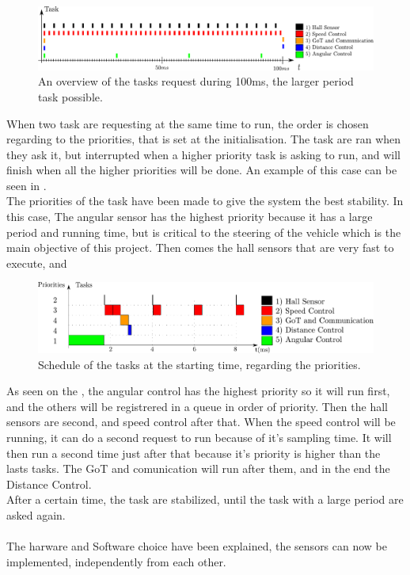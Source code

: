 \begin{figure}[H]
	\centering
	\includegraphics[scale=0.6]{figures/scheduleRequest.pdf}
	\caption{An overview of the tasks request during 100ms, the larger period task possible.}
	\label{scheduleRequestdRobinSchedule}
\end{figure}


When two task are requesting at the same time to run, the order is chosen regarding to the priorities, that is set at the initialisation. The task are ran when they ask it, but interrupted when a higher priority task is asking to run, and will finish when all the higher priorities will be done. An example of this case can be seen in .\\
The priorities of the task have been made to give the system the best stability. In this case, The angular sensor has the highest priority because it has a large period and running time, but is critical to the steering of the vehicle which is the main objective of this project. Then comes the hall sensors that are very fast to execute, and 

 \begin{figure}[H]
	\centering
	\includegraphics[scale=0.5]{figures/schedulePriorities.pdf}
	\caption{Schedule of the tasks at the starting time, regarding the priorities.}
	\label{schedulePriorities}
\end{figure}

As seen on the  , the angular control has the highest priority so it will run first, and the others will be registrered in a queue in order of priority. Then the hall sensors are second, and speed control after that. When the speed control will be running, it can do a second request to run because of it's sampling time. It will then run a second time just after that because it's priority is higher than the lasts tasks. The GoT and comunication will run after them, and in the end the Distance Control.\\
After a certain time, the task are stabilized, until the task with a large period are asked again.\\\\



The harware and Software choice have been explained, the sensors can now be implemented, independently from each other.